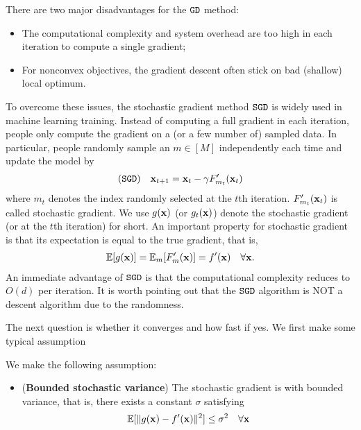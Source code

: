 There are two major disadvantages for the $\texttt{GD}$ method:
\begin{itemize}
\item The computational complexity and system overhead are too high in each iteration to compute a single gradient;
\item For nonconvex objectives, the gradient descent often stick on bad (shallow) local optimum.
\end{itemize}

To overcome these issues, the stochastic gradient method $\texttt{SGD}$ is widely used in machine learning training. Instead of computing a full gradient in each iteration, people only compute the gradient on a (or a few number of) sampled data. In particular, people randomly sample an $m\in [M]$ independently each time and update the model by
\begin{align}
(\texttt{SGD})\quad {\bf x}_{t+1} = {\bf x}_t - \gamma F'_{m_t}({\bf x}_t)
\label{eq:sgd}
\end{align}
where $m_t$ denotes the index randomly selected at the $t$th iteration. $F'_{m_t}({\bf x}_t)$ is called stochastic gradient. We use $g({\bf x})$ (or $g_t({\bf x})$) denote the stochastic gradient (or at the $t$th iteration) for short. An important property for stochastic gradient is that its expectation is equal to the true gradient, that is,
\begin{align}
\mathbb{E}[g({\bf x})] = \mathbb{E}_{m} [F'_{m}({\bf x})] = f'({\bf x}) \quad \forall {\bf x}.
\end{align}
An immediate advantage of $\texttt{SGD}$ is that the computational complexity reduces to $O(d)$ per iteration. It is worth pointing out that the $\texttt{SGD}$ algorithm is NOT a descent algorithm due to the randomness.

The next question is whether it converges and how fast if yes. We first make some typical assumption
\begin{tcolorbox}[colback=pink!5!white,colframe=black!75!black]
\begin{assumption} \label{ass:sgd}
%
We make the following assumption:
\begin{itemize}
\item ({\bf Bounded stochastic variance}) The stochastic gradient is with bounded variance, that is, there exists a constant $\sigma$ satisfying
\[
\mathbb{E}[\|g({\bf x}) - f'({\bf x})\|^2] \leq \sigma^2\quad \forall {\bf x}
\]
\end{itemize}
\end{assumption}
\end{tcolorbox}


